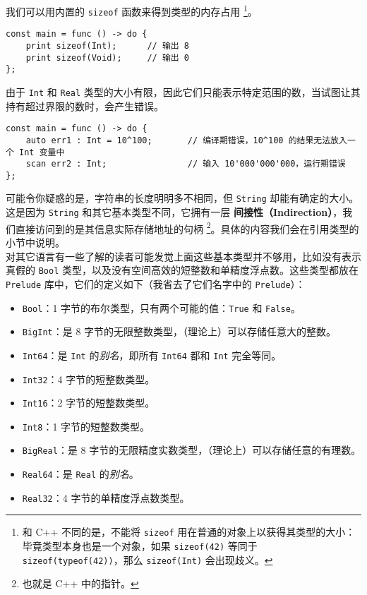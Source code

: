 我们可以用内置的 \lstinline!sizeof! 函数来得到类型的内存占用 \footnote{和 C++ 不同的是，不能将 \lstinline!sizeof! 用在普通的对象上以获得其类型的大小：毕竟类型本身也是一个对象，如果 \lstinline!sizeof(42)! 等同于 \lstinline!sizeof(typeof(42))!，那么 \lstinline!sizeof(Int)! 会出现歧义。}。

\begin{lstlisting}
const main = func () -> do {
    print sizeof(Int);      // 输出 8
    print sizeof(Void);     // 输出 0
};
\end{lstlisting}

由于 \lstinline!Int! 和 \lstinline!Real! 类型的大小有限，因此它们只能表示特定范围的数，当试图让其持有超过界限的数时，会产生错误。

\begin{lstlisting}
const main = func () -> do {
    auto err1 : Int = 10^100;       // 编译期错误，10^100 的结果无法放入一个 Int 变量中
    scan err2 : Int;                // 输入 10'000'000'000，运行期错误
};
\end{lstlisting}

可能令你疑惑的是，字符串的长度明明多不相同，但 \lstinline!String! 却能有确定的大小。这是因为 \lstinline!String! 和其它基本类型不同，它拥有一层 \textbf{间接性（Indirection）}，我们直接访问到的是其信息实际存储地址的句柄 \footnote{也就是 C++ 中的指针。}。具体的内容我们会在引用类型的小节中说明。 \\

对其它语言有一些了解的读者可能发觉上面这些基本类型并不够用，比如没有表示真假的 \lstinline!Bool! 类型，以及没有空间高效的短整数和单精度浮点数。这些类型都放在 \lstinline!Prelude! 库中，它们的定义如下（我省去了它们名字中的 \lstinline!Prelude!）：

\begin{itemize}
    \item \lstinline!Bool!：1 字节的布尔类型，只有两个可能的值：\lstinline!True! 和 \lstinline!False!。
    \item \lstinline!BigInt!：是 8 字节的无限整数类型，（理论上）可以存储任意大的整数。
    \item \lstinline!Int64!：是 \lstinline!Int! 的\emph{别名}，即所有 \lstinline!Int64! 都和 \lstinline!Int! 完全等同。
    \item \lstinline!Int32!：4 字节的短整数类型。
    \item \lstinline!Int16!：2 字节的短整数类型。
    \item \lstinline!Int8!：1 字节的短整数类型。
    \item \lstinline!BigReal!：是 8 字节的无限精度实数类型，（理论上）可以存储任意的有理数。
    \item \lstinline!Real64!：是 \lstinline!Real! 的\emph{别名}。
    \item \lstinline!Real32!：4 字节的单精度浮点数类型。
\end{itemize}

